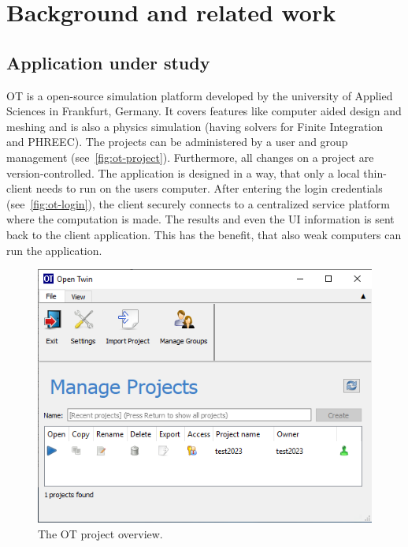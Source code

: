 
\chapter{Background and related work} %

\label{chap:background} %


\section{Application under study}
\acf{OT} is a open-source simulation platform developed by the university of Applied Sciences in Frankfurt, Germany. It covers features like computer aided design and meshing and is also a physics simulation (having solvers for Finite Integration and PHREEC). The projects can be administered by a user and group management (see~\autoref{fig:ot-project}). Furthermore, all changes on a project are version-controlled. The application is designed in a way, that only a local thin-client needs to run on the users computer. After entering the login credentials (see~\autoref{fig:ot-login}), the client securely connects to a centralized service platform where the computation is made. The results and even the \ac{UI} information is sent back to the client application. This has the benefit, that also weak computers can run the application.

\begin{figure}[h]
	\centering
	\includegraphics[width=.9\textwidth]{Figures/ot-project.png}
	\caption{The \ac{OT} project overview.}
	\label{fig:ot-project}
\end{figure}


